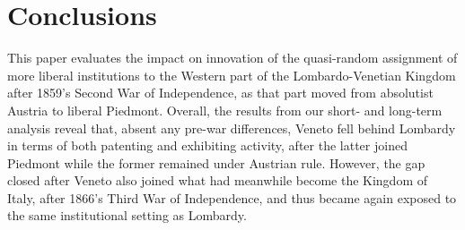 






\FloatBarrier

\section{Conclusions}


This paper evaluates the impact on innovation of the quasi-random assignment of more liberal institutions to the Western part of the Lombardo-Venetian Kingdom after 1859's Second War of Independence, as that part moved from absolutist Austria to liberal Piedmont. 
Overall, the results from our short- and long-term analysis reveal that, absent any pre-war differences, Veneto fell behind Lombardy in terms of both patenting and exhibiting activity, after the latter joined Piedmont while the former remained under Austrian rule. 
However, the gap closed after Veneto also joined what had meanwhile become the Kingdom of Italy, after 1866's Third War of Independence, and thus became again exposed to the same institutional setting as Lombardy. 

\newpage




\clearpage







